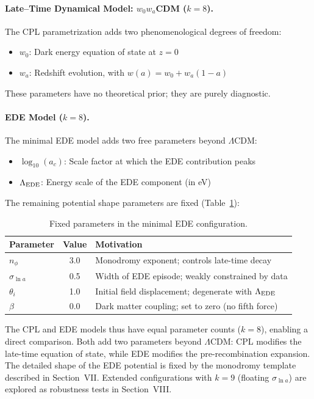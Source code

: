 \documentclass[a4paper,11pt]{article}
\begin{document}
\paragraph{Late--Time Dynamical Model: $w_0 w_a$CDM ($k = 8$).}
The CPL parametrization adds two phenomenological degrees of freedom:
\begin{itemize}
    \item $w_0$: Dark energy equation of state at $z = 0$
    \item $w_a$: Redshift evolution, with $w(a) = w_0 + w_a(1 - a)$
\end{itemize}
These parameters have no theoretical prior; they are purely diagnostic.

\paragraph{EDE Model ($k = 8$).}
The minimal EDE model adds two free parameters beyond $\Lambda$CDM:
\begin{itemize}
    \item $\log_{10}(a_c)$: Scale factor at which the EDE contribution peaks
    \item $\Lambda_{\rm EDE}$: Energy scale of the EDE component (in eV)
\end{itemize}

The remaining potential shape parameters are fixed (Table~\ref{tab:fixed_params}):

\begin{table}[h]
\centering
\caption{Fixed parameters in the minimal EDE configuration.}
\label{tab:fixed_params}
\begin{tabular}{lcl}
\toprule
Parameter & Value & Motivation \\
\midrule
$n_\phi$ & 3.0 & Monodromy exponent; controls late-time decay \\
$\sigma_{\ln a}$ & 0.5 & Width of EDE episode; weakly constrained by data \\
$\theta_i$ & 1.0 & Initial field displacement; degenerate with $\Lambda_{\rm EDE}$ \\
$\beta$ & 0.0 & Dark matter coupling; set to zero (no fifth force) \\
\bottomrule
\end{tabular}
\end{table}

The CPL and EDE models thus have equal parameter counts ($k = 8$), enabling a direct comparison. Both add two parameters beyond $\Lambda$CDM: CPL modifies the late-time equation of state, while EDE modifies the pre-recombination expansion. The detailed shape of the EDE potential is fixed by the monodromy template described in Section~VII. Extended configurations with $k = 9$ (floating $\sigma_{\ln a}$) are explored as robustness tests in Section~VIII.
\end{document}
